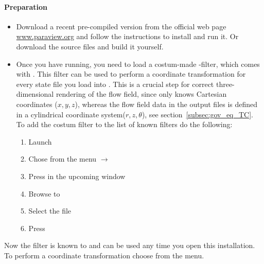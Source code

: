 \documentclass[a4paper, 11pt, DIV=11]{scrartcl}
\begin{document}
\paragraph{Preparation}
\begin{itemize}
\item
Download a recent pre-compiled version from the official web page
\url{www.paraview.org} and follow the instructions to install and
run it. Or download the source files and build it yourself.
\item
Once you have  running, you need to load a  costum-made
-filter, which comes with \nsc. This filter can be used to
perform a coordinate transformation for every state file you load into
. This is a crucial step for correct three-dimensional
rendering of the flow field, since  only knows Cartesian
coordinates ($x, y, z$), whereas the flow field data in the 
output files is defined in a cylindrical coordinate system($r, z, \theta$),
see section~\ref{subsec:gov_eq_TC}. To add the  costum filter to the list of known filters
do the following:
\begin{enumerate}
\item Launch \paraview
\item Chose from the menu  $\to$ 
\item Press  in the upcoming window
\item Browse to 
\item Select the file 
\item Press 
\end{enumerate}
\end{itemize}
Now the filter is known to \paraview and can be used any time you
open this installation. To perform a coordinate transformation choose
from the menu.
\end{document}
